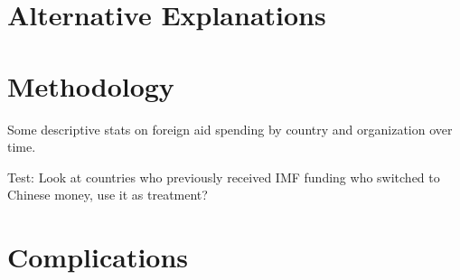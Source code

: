 \documentclass{article}
\begin{document}
\section*{Alternative Explanations}

\section*{Methodology}
Some descriptive stats on foreign aid spending by country and organization over time. 

Test: Look at countries who previously received IMF funding who switched to Chinese money, use it as treatment?

\section*{Complications}


\printbibliography
\end{document}

